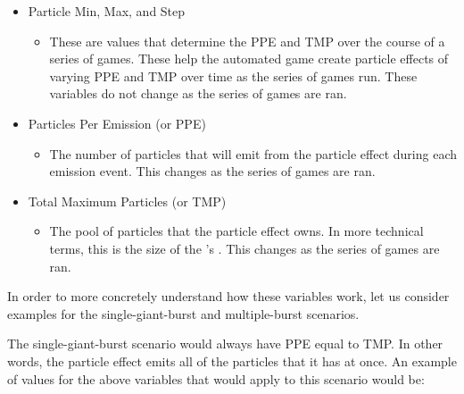 \begin{itemize}[nolistsep,topsep=0pt]

	\item Particle Min, Max, and Step 
		\begin{itemize}[nolistsep,topsep=0pt]
			\item These are values that determine the PPE and TMP over the course of a series of games. These help the automated game create particle effects of varying PPE and TMP over time as the series of games run. These variables do not change as the series of games are ran.
		\end{itemize}

	\item Particles Per Emission (or PPE)
		\begin{itemize}[nolistsep,topsep=0pt]
			\item The number of particles that will emit from the particle effect during each emission event. This changes as the series of games are ran.
		\end{itemize}

	\item Total Maximum Particles (or TMP)
		\begin{itemize}[nolistsep,topsep=0pt]
			\item The pool of particles that the particle effect owns. In more technical terms, this is the size of the 's . This changes as the series of games are ran.
		\end{itemize}

\end{itemize}

In order to more concretely understand how these variables work, let us consider examples for the single-giant-burst and multiple-burst scenarios\footnotemark. 


The single-giant-burst scenario would always have PPE equal to TMP. In other words, the particle effect emits all of the particles that it has at once. An example of values for the above variables that would apply to this scenario would be:

